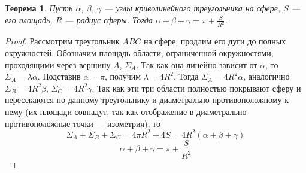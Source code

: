 \documentclass[12pt]{article}
\theoremstyle{plain}
\newtheorem{theorem}{Теорема}[section]
\begin{document}
    \begin{theorem}
        Пусть $\alpha$, $\beta$, $\gamma$ --- углы криволинейного треугольника на сфере, $S$ --- его площадь, $R$ --- радиус сферы. Тогда $\alpha+\beta+\gamma=\pi+\frac{S}{R^2}$.
    \end{theorem}
    \begin{proof}
        Рассмотрим треугольник $ABC$ на сфере, продлим его дуги до полных окружностей. Обозначим площадь области, ограниченной окружностями, проходящими через вершину $A$, $\Sigma_A$. Так как она линейно зависит от $\alpha$, то $\Sigma_A=\lambda\alpha$. Подставив $\alpha=\pi$, получим $\lambda=4R^2$. Тогда $\Sigma_A=4R^2\alpha$, аналогично $\Sigma_B=4R^2\beta$, $\Sigma_C=4R^2\gamma$. Так как эти три области полностью покрывают сферу и пересекаются по данному треугольнику и диаметрально противоположному к нему (их площади совпадут, так как отображение в диаметрально противоположные точки --- изометрия), то $$\Sigma_A+\Sigma_B+\Sigma_C=4\pi R^2+4S=4R^2(\alpha+\beta+\gamma)$$
        $$\alpha+\beta+\gamma=\pi+\frac{S}{R^2}$$
    \end{proof}
\end{document}
